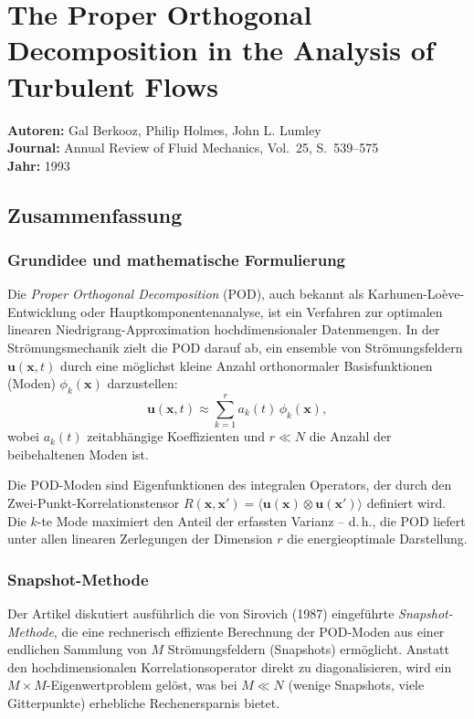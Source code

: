 \documentclass[a4paper,12pt]{article}
\begin{document}
\section*{The Proper Orthogonal Decomposition in the Analysis of Turbulent Flows}
\textbf{Autoren:} Gal Berkooz, Philip Holmes, John L. Lumley \\
\textbf{Journal:} Annual Review of Fluid Mechanics, Vol.\ 25, S.\ 539--575 \\
\textbf{Jahr:} 1993

\subsection*{Zusammenfassung}

\subsubsection*{Grundidee und mathematische Formulierung}

Die \emph{Proper Orthogonal Decomposition} (POD), auch bekannt als Karhunen-Lo\`eve-Entwicklung oder Hauptkomponentenanalyse, ist ein Verfahren zur optimalen linearen Niedrigrang-Approximation hochdimensionaler Datenmengen. In der Strömungsmechanik zielt die POD darauf ab, ein ensemble von Strömungsfeldern $\mathbf{u}(\mathbf{x}, t)$ durch eine möglichst kleine Anzahl orthonormaler Basisfunktionen (Moden) $\phi_k(\mathbf{x})$ darzustellen:
\begin{equation}
\mathbf{u}(\mathbf{x}, t) \approx \sum_{k=1}^{r} a_k(t)\,\phi_k(\mathbf{x}),
\end{equation}
wobei $a_k(t)$ zeitabhängige Koeffizienten und $r \ll N$ die Anzahl der beibehaltenen Moden ist.

Die POD-Moden sind Eigenfunktionen des integralen Operators, der durch den Zwei-Punkt-Korrelationstensor $R(\mathbf{x}, \mathbf{x}') = \langle \mathbf{u}(\mathbf{x}) \otimes \mathbf{u}(\mathbf{x}') \rangle$ definiert wird. Die $k$-te Mode maximiert den Anteil der erfassten Varianz -- d.\,h., die POD liefert unter allen linearen Zerlegungen der Dimension $r$ die energieoptimale Darstellung.

\subsubsection*{Snapshot-Methode}

Der Artikel diskutiert ausführlich die von Sirovich (1987) eingeführte \emph{Snapshot-Methode}, die eine rechnerisch effiziente Berechnung der POD-Moden aus einer endlichen Sammlung von $M$ Strömungsfeldern (Snapshots) ermöglicht. Anstatt den hochdimensionalen Korrelationsoperator direkt zu diagonalisieren, wird ein $M \times M$-Eigenwertproblem gelöst, was bei $M \ll N$ (wenige Snapshots, viele Gitterpunkte) erhebliche Rechenersparnis bietet.
\end{document}
